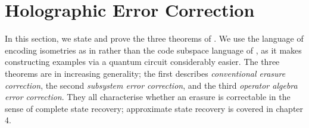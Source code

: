\documentclass[12pt,a4paper]{report}
\numberwithin{equation}{section}
\theoremstyle{definition}
\theoremstyle{theorem}
\theoremstyle{theorem}
\theoremstyle{example}
\theoremstyle{definition}
\begin{document}
\chapter{Holographic Error Correction}

In this section, we state and prove the three theorems of \cite{Harlow}. We use the language of encoding isometries as in \cite{Pollack} rather than the code subspace language of \cite{Harlow}, as it makes constructing examples via a quantum circuit considerably easier. The three theorems are in increasing generality; the first describes \textit{conventional erasure correction}, the second \textit{subsystem error correction}, and the third \textit{operator algebra error correction}. They all characterise whether an erasure is correctable in the sense of complete state recovery; approximate state recovery is covered in chapter 4.
\end{document}
